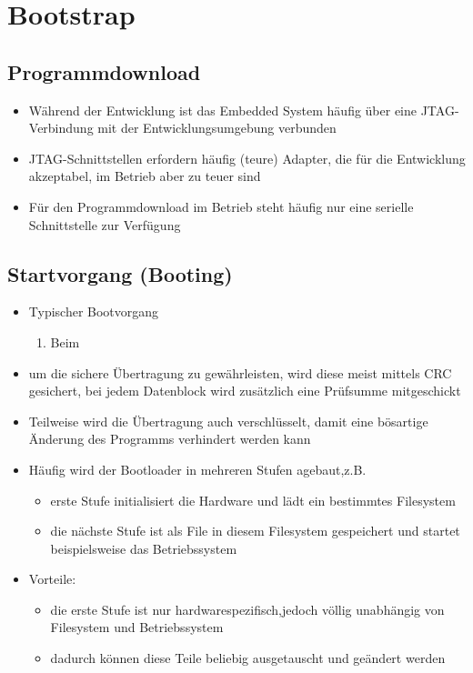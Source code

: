 \section{Bootstrap}
\subsection{Programmdownload }
\begin{itemize}
	\item Während der Entwicklung ist das Embedded System häufig über eine JTAG-Verbindung mit der Entwicklungsumgebung verbunden 
	\item JTAG-Schnittstellen erfordern häufig (teure) Adapter, die für die Entwicklung akzeptabel, im Betrieb aber zu teuer sind
	\item Für den Programmdownload im Betrieb steht häufig nur eine serielle Schnittstelle zur Verfügung
\end{itemize}
\subsection{Startvorgang (Booting) }
\begin{itemize}
	\item Typischer Bootvorgang
	\begin{enumerate}
		\item Beim 
	\end{enumerate}
	\item um die sichere Übertragung zu gewährleisten, wird diese meist mittels CRC gesichert, bei jedem Datenblock wird zusätzlich eine Prüfsumme mitgeschickt
	\item Teilweise wird die Übertragung auch verschlüsselt, damit eine bösartige Änderung des Programms verhindert werden kann
	\item Häufig wird der Bootloader in mehreren Stufen agebaut,z.B.
	\begin{itemize}
		\item erste Stufe initialisiert die Hardware und lädt ein bestimmtes Filesystem
		\item die nächste Stufe ist als File in diesem Filesystem gespeichert und startet beispielsweise das Betriebssystem
	\end{itemize}
	\item Vorteile:
	\begin{itemize}
		\item die erste Stufe ist nur hardwarespezifisch,jedoch völlig unabhängig von Filesystem und Betriebssystem
		\item dadurch können diese Teile beliebig ausgetauscht und geändert werden
	\end{itemize}
\end{itemize}

